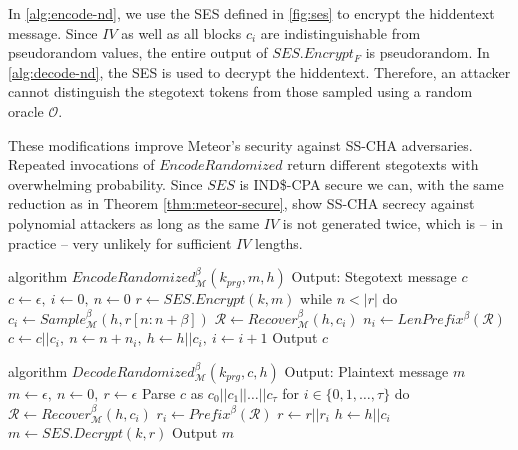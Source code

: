 
In \autoref{alg:encode-nd}, we use the SES defined in \autoref{fig:ses} to encrypt the hiddentext message.
Since $IV$ as well as all blocks $c_i$ are indistinguishable from pseudorandom values, the entire output of $SES.Encrypt_F$ is pseudorandom.
In \autoref{alg:decode-nd}, the SES is used to decrypt the hiddentext.
Therefore, an attacker cannot distinguish the stegotext tokens from those sampled using a random oracle $\mathcal{O}$.

These modifications improve Meteor's security against SS-CHA adversaries.
Repeated invocations of $EncodeRandomized$ return different stegotexts with overwhelming probability.
Since $SES$ is IND\$-CPA secure we can, with the same reduction as in Theorem \ref{thm:meteor-secure}, show SS-CHA secrecy against polynomial attackers as long as the same $IV$ is not generated twice, which is -- in practice -- very unlikely for sufficient $IV$ lengths.


\begin{Pseudocode}[float, caption={
Meteor $EncodeRandomized$ Algorithm.
This algorithm differs from the original $Encode$ algorithm by using SES to encrypt the message.
The ciphertext (which is indistinguishable from randomness and indeterministic) is then used to sample from $\mathcal{M}$.
}, label={alg:encode-nd}]
algorithm $EncodeRandomized_{\mathcal{M}}^{\beta}(k_{prg}, m, h)$
	Output: Stegotext message $c$
	$c \leftarrow \epsilon,~ i \leftarrow 0,~ n \leftarrow 0$
	$r \leftarrow SES.Encrypt(k, m)$
	while $n < |r|$ do
		$c_i \leftarrow Sample_{\mathcal{M}}^\beta(h, r[n: n+\beta])$
		$\mathcal{R} \leftarrow Recover_{\mathcal{M}}^\beta(h, c_i)$
		$n_i \leftarrow LenPrefix^\beta(\mathcal{R})$
		$c \leftarrow c || c_i,~ n \leftarrow n+n_i,~ h \leftarrow h||c_i,~ i \leftarrow i + 1$
	Output $c$
\end{Pseudocode}
\begin{Pseudocode}[float, caption={
Meteor $DecodeRandomized$ Algorithm.
This algorithm differs from the original Decode algorithm by using SES to decrypt the stegotext.
}, label={alg:decode-nd}]
algorithm $DecodeRandomized_{\mathcal{M}}^{\beta}(k_{prg}, c, h)$
	Output: Plaintext message $m$
	$m \leftarrow \epsilon,~ n \leftarrow 0,~ r \leftarrow \epsilon$
	Parse $c$ as $c_0 || c_1 || \dots || c_{\tau}$
	for $i \in \{ 0, 1, \dots, \tau \}$ do
		$\mathcal{R} \leftarrow Recover_{\mathcal{M}}^\beta(h, c_i)$
		$r_i \leftarrow Prefix^\beta(\mathcal{R})$
		$r \leftarrow r || r_i$
		$h \leftarrow h||c_i$
	$m \leftarrow SES.Decrypt(k, r)$
	Output $m$
\end{Pseudocode}